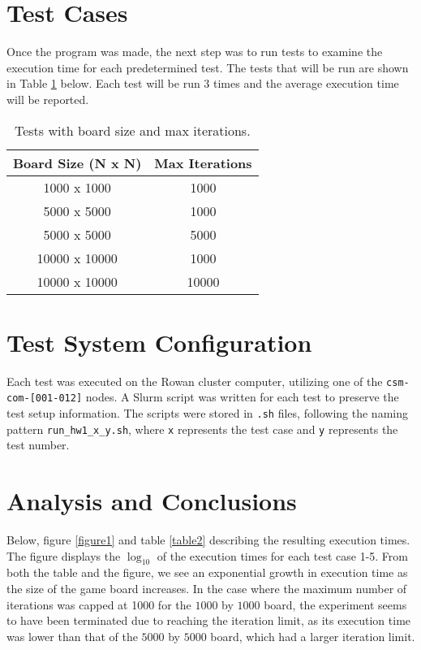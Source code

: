 \documentclass{article}
\begin{document}
	\section{Test Cases}
	Once the program was made, the next step was to run tests to examine the execution time for each predetermined test. The tests that will be run are shown in Table \ref{table1} below. Each test will be run 3 times and the average execution time will be reported.

	\begin{table}[ht]
		\centering
		\begin{tabular}{|c|c|}
			\hline
			\textbf{Board Size (N x N)} & \textbf{Max Iterations} \\
			\hline
			1000 x 1000 & 1000 \\
			5000 x 5000 & 1000 \\
			5000 x 5000 & 5000 \\
			10000 x 10000 & 1000 \\
			10000 x 10000 & 10000 \\
			\hline
		\end{tabular}
		\caption{Tests with board size and max iterations.}
		\label{table1}
	\end{table}

	\section{Test System Configuration}
	Each test was executed on the Rowan cluster computer, utilizing one of the \texttt{csm-com-[001-012]} nodes. A Slurm script was written for each test to preserve the test setup information. The scripts were stored in \texttt{.sh} files, following the naming pattern \texttt{run\_hw1\_x\_y.sh}, where \texttt{x} represents the test case and \texttt{y} represents the test number.

	
	\section{Analysis and Conclusions}
	Below, figure \ref{figure1} and table \ref{table2} describing the resulting execution times. The figure displays the \(\log_{10}\) of the execution times for each test case 1-5. From both the table and the figure, we see an exponential growth in execution time as the size of the game board increases. In the case where the maximum number of iterations was capped at 1000 for the \(1000\) by \(1000\) board, the experiment seems to have been terminated due to reaching the iteration limit, as its execution time was lower than that of the \(5000\) by \(5000\) board, which had a larger iteration limit.
	
\end{document}
